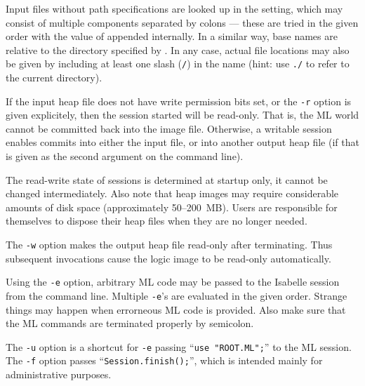 \begin{isabellebody}
\begin{isamarkuptext}
  Input files without path specifications are looked up in the
  \hyperlink{setting.ISABELLE-PATH}{\mbox{}} setting, which may consist of multiple
  components separated by colons --- these are tried in the given
  order with the value of \hyperlink{setting.ML-IDENTIFIER}{\mbox{}} appended
  internally.  In a similar way, base names are relative to the
  directory specified by \hyperlink{setting.ISABELLE-OUTPUT}{\mbox{}}.  In any case,
  actual file locations may also be given by including at least one
  slash (\verb|/|) in the name (hint: use \verb|./| to
  refer to the current directory).%
\end{isamarkuptext}%
\isamarkuptrue%
%
\isamarkuptrue%
%
\begin{isamarkuptext}%
If the input heap file does not have write permission bits set, or
  the \verb|-r| option is given explicitely, then the session
  started will be read-only.  That is, the ML world cannot be
  committed back into the image file.  Otherwise, a writable session
  enables commits into either the input file, or into another output
  heap file (if that is given as the second argument on the command
  line).

  The read-write state of sessions is determined at startup only, it
  cannot be changed intermediately. Also note that heap images may
  require considerable amounts of disk space (approximately
  50--200~MB). Users are responsible for themselves to dispose their
  heap files when they are no longer needed.

  \medskip The \verb|-w| option makes the output heap file
  read-only after terminating.  Thus subsequent invocations cause the
  logic image to be read-only automatically.

  \medskip Using the \verb|-e| option, arbitrary ML code may be
  passed to the Isabelle session from the command line. Multiple
  \verb|-e|'s are evaluated in the given order. Strange things
  may happen when errorneous ML code is provided. Also make sure that
  the ML commands are terminated properly by semicolon.

  \medskip The \verb|-u| option is a shortcut for \verb|-e| passing ``\verb|use "ROOT.ML";|'' to the ML session.
  The \verb|-f| option passes ``\verb|Session.finish();|'', which is intended mainly for administrative
  purposes.


\end{isamarkuptext}
\end{isabellebody}
